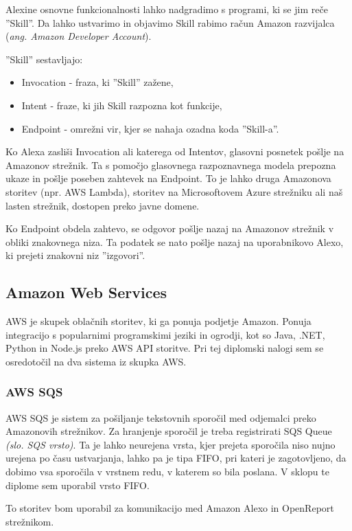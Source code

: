 \documentclass[a4paper, 12pt]{book}
\begin{document}
Alexine osnovne funkcionalnosti lahko nadgradimo s programi, ki se jim reče ''Skill''.
Da lahko ustvarimo in objavimo Skill rabimo račun Amazon razvijalca (\textit{ang. Amazon Developer Account}).


''Skill'' sestavljajo:
\begin{itemize}
	\item Invocation - fraza, ki ''Skill'' zažene,
	\item Intent - fraze, ki jih Skill razpozna kot funkcije,
	\item Endpoint - omrežni vir, kjer se nahaja ozadna koda ''Skill-a''.
\end{itemize}

Ko Alexa zasliši Invocation ali katerega od Intentov, glasovni posnetek pošlje na Amazonov strežnik.
Ta s pomočjo glasovnega razpoznavnega modela prepozna ukaze in pošlje poseben zahtevek na Endpoint.
To je lahko druga Amazonova storitev (npr. AWS Lambda), storitev na Microsoftovem Azure strežniku ali naš lasten strežnik, dostopen preko javne domene.

Ko Endpoint obdela zahtevo, se odgovor pošlje nazaj na Amazonov strežnik v obliki znakovnega niza.
Ta podatek se nato pošlje nazaj na uporabnikovo Alexo, ki prejeti znakovni niz ''izgovori''.

\subsection{Amazon Web Services}

AWS je skupek oblačnih storitev, ki ga ponuja podjetje Amazon.
Ponuja integracijo s popularnimi programskimi jeziki in ogrodji, kot so Java, .NET, Python in Node.js preko AWS API storitve.
Pri tej diplomski nalogi sem se osredotočil na dva sistema iz skupka AWS.

\subsubsection{AWS SQS}

AWS SQS je sistem za pošiljanje tekstovnih sporočil med odjemalci preko Amazonovih strežnikov.
Za hranjenje sporočil je treba registrirati SQS Queue \textit{(slo. SQS vrsto)}. 
Ta je lahko neurejena vrsta, kjer prejeta sporočila niso nujno urejena po času ustvarjanja, lahko pa je tipa FIFO, pri kateri je zagotovljeno, da dobimo vsa sporočila v vrstnem redu, v katerem so bila poslana.
V sklopu te diplome sem uporabil vrsto FIFO.

To storitev bom uporabil za komunikacijo med Amazon Alexo in OpenReport strežnikom.
\end{document}
